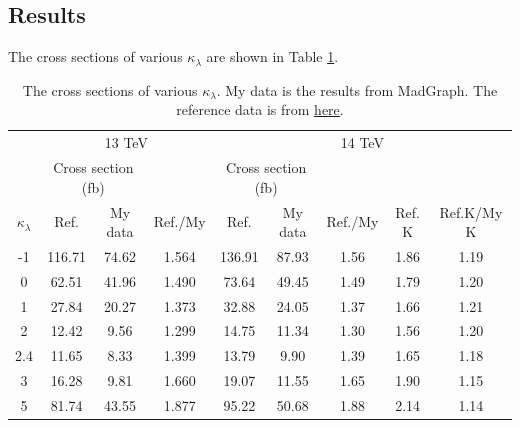 \documentclass[12pt]{article}
\begin{document}
	\subsection{Results}%
	\label{sub:di_Higgs_sample_generating_results}
		The cross sections of various $\kappa_\lambda$ are shown in Table \ref{tab:di-Higgs-SM-kappa-cross-section}.
		\begin{table}[htpb]
			\centering
			\caption{The cross sections of various $\kappa_\lambda$. My data is the results from MadGraph. The reference data is from \href{https://link.springer.com/content/pdf/10.1007/JHEP06(2019)066.pdf}{here}. }
			\label{tab:di-Higgs-SM-kappa-cross-section}
			\begin{tabular}{c|cc|c|cc|cc|c}
							 & \multicolumn{3}{c|}{13 TeV}                     & \multicolumn{5}{c}{14 TeV}                                     \\
							 & \multicolumn{2}{c|}{Cross section (fb)} &        & \multicolumn{2}{c|}{Cross section (fb)} &       &               \\
							 $\kappa_\lambda$ & Ref.              & My data            & Ref./My& Ref.              & My data            &Ref./My& Ref. K& Ref.K/My K \\ \hline
			-1               & 116.71            & 74.62              & 1.564  & 136.91            & 87.93              & 1.56 & 1.86 & 1.19  \\
			0                & 62.51             & 41.96              & 1.490  & 73.64             & 49.45              & 1.49 & 1.79 & 1.20  \\
			1                & 27.84             & 20.27              & 1.373  & 32.88             & 24.05              & 1.37 & 1.66 & 1.21  \\
			2                & 12.42             & 9.56               & 1.299  & 14.75             & 11.34              & 1.30 & 1.56 & 1.20  \\
			2.4              & 11.65             & 8.33               & 1.399  & 13.79             & 9.90               & 1.39 & 1.65 & 1.18  \\
			3                & 16.28             & 9.81               & 1.660  & 19.07             & 11.55              & 1.65 & 1.90 & 1.15  \\
			5                & 81.74             & 43.55              & 1.877  & 95.22             & 50.68              & 1.88 & 2.14 & 1.14  \\
			\end{tabular}
		\end{table}
\end{document}
